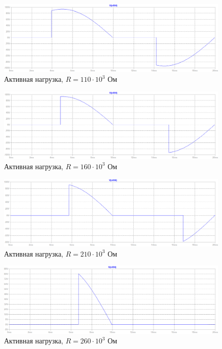 \documentclass[a4paper, 12pt]{article}
\begin{document}
    \begin{figure}[H]
        \centering
        \includegraphics[scale=0.45]{R2-110k.png}
        \captionsetup{skip=0pt}
        \caption{Активная нагрузка, $R=110\cdot10^3$ Ом}
        \label{fig:R2-110k}
    \end{figure}
    \begin{figure}[H]
        \centering
        \includegraphics[scale=0.45]{R2-160k.png}
        \captionsetup{skip=0pt}
        \caption{Активная нагрузка, $R=160\cdot10^3$ Ом}
        \label{fig:R2-160k}
    \end{figure}
    \begin{figure}[H]
        \centering
        \includegraphics[scale=0.45]{R2-210k.png}
        \captionsetup{skip=0pt}
        \caption{Активная нагрузка, $R=210\cdot10^3$ Ом}
        \label{fig:R2-210k}
    \end{figure}
    \begin{figure}[H]
        \centering
        \includegraphics[scale=0.45]{R2-260k.png}
        \captionsetup{skip=0pt}
        \caption{Активная нагрузка, $R=260\cdot10^3$ Ом}
        \label{fig:R2-260k}
    \end{figure}
\end{document}
